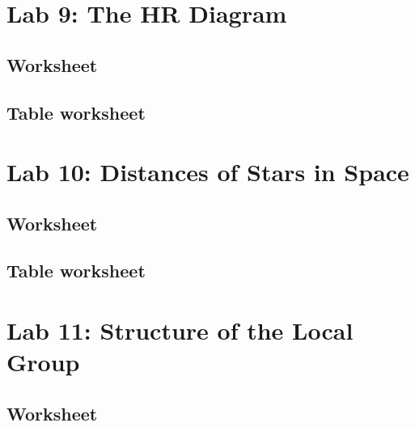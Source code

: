 \documentclass[12pt]{article}
\begin{document}
\newpage
\section{Lab 9: The HR Diagram}\label{apx:lab_09}
\subsection{Worksheet}\label{apx:lab_09_ws}


\newpage
\subsection{Table worksheet}\label{apx:lab_09_tb}

\newpage
\section{Lab 10: Distances of Stars in Space}\label{apx:lab_10}
\subsection{Worksheet}\label{apx:lab_10_ws}


\newpage
\subsection{Table worksheet}\label{apx:lab_10_tb}

\newpage
\section{Lab 11: Structure of the Local Group}\label{apx:lab_11}
\subsection{Worksheet}\label{apx:lab_11_ws}
%
\end{document}
